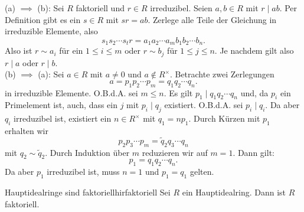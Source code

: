 \begin{beweis}
(a) $\implies$ (b): Sei $R$ faktoriell und $r\in R$ irreduzibel. Seien $a,b \in R$ mit $r \mid ab$. Per Definition gibt es ein $s \in R$ mit $sr = ab$. Zerlege alle Teile der Gleichung in irreduzible Elemente, also
\begin{equation}
s_1s_2 \cdots s_t r = a_1 a_2  \cdots a_m b_1 b_2 \cdots b_n.
\end{equation}
Also ist $r \sim a_i$ für ein $1 \leq i \leq m$ oder $r \sim b_j$ für $1 \leq j \leq n$. Je nachdem gilt also $r \mid a$ oder $r \mid b$.\\
(b) $\implies$ (a): Sei $a \in R$ mit $a \neq 0$ und $a \notin R^\times$. Betrachte zwei Zerlegungen
\begin{equation}
a = p_1 p_2 \cdots p_m = q_1 q_2 \cdots q_n.
\end{equation}
in irreduzible Elemente. O.B.d.A. sei $m \leq n$. Es gilt $p_1 \mid q_1 q_2 \cdots q_n$ und, da $p_i$ ein Primelement ist, auch, dass ein $j$ mit $p_i \mid q_j$ existiert. O.B.d.A. sei $p_i \mid q_i$. Da aber $q_i$ irreduzibel ist, existiert ein $n \in R^\times$ mit $q_1 = np_1$. Durch Kürzen mit $p_1$ erhalten wir 
\begin{equation}
p_2 p_3 \cdots p_m = \tilde{q}_2 q_3 \cdots q_n
\end{equation}
mit $q_2 \sim \tilde{q}_2$. Durch Induktion über $m$ reduzieren wir auf $m=1$. Dann gilt:
\begin{equation}
p_1 = q_1 q_2 \cdots q_n.
\end{equation}
Da aber $p_1$ irreduzibel ist, muss $n=1$ und $p_1 = q_1$ gelten.
\end{beweis}
\begin{satz}{Hauptidealringe sind faktoriell}{hirfaktoriell}
Sei $R$ ein Hauptidealring. Dann ist $R$ faktoriell.
\end{satz}
